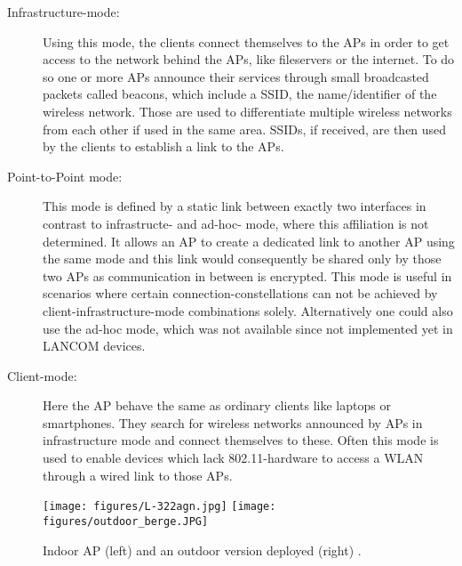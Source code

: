     \begin{description}
      \item[Infrastructure-mode:]
	Using this mode, the clients connect themselves to the APs in order to get access to the network behind the APs, like fileservers or the internet.
	To do so one or more APs announce their services through small broadcasted packets called beacons, which include a \ac{SSID}, 
	the name/identifier of the wireless network. Those are used to differentiate multiple wireless networks from each other if used in the same area. 
	SSIDs, if received, are then used by the clients to establish a link to the APs.

      \item [Point-to-Point mode:]
	This mode is defined by a static link between exactly two interfaces in contrast to infrastructe- and ad-hoc- mode, where this affiliation is not determined.
	It allows an \ac{AP} to create a dedicated link to another \ac{AP} using the same mode and this link would consequently be shared only by those two APs
	as communication in between is encrypted. This mode is useful in scenarios where certain connection-constellations can not be achieved by 
	client-infrastructure-mode combinations solely. Alternatively one could also use the ad-hoc mode, which was not available since not implemented yet in LANCOM devices.
	
      \item [Client-mode:]
	Here the \ac{AP} behave the same as ordinary clients like laptops or smartphones.
	They search for wireless networks announced by APs in infrastructure mode and connect themselves to these.
	Often this mode is used to enable devices which lack 802.11-hardware to access a \ac{WLAN} through a wired link to those APs.
    \end{description}
    
    \begin{figure}[bh!]
      \centerline{
	\texttt{[image: figures/L-322agn.jpg]}
	\texttt{[image: figures/outdoor\_berge.JPG]}
      }
      \caption{Indoor \ac{AP} (left) and an outdoor version deployed (right) \cite{lancom}.}
      \label{fig:L-322agn}
    \end{figure}
    
    \newpage
     
